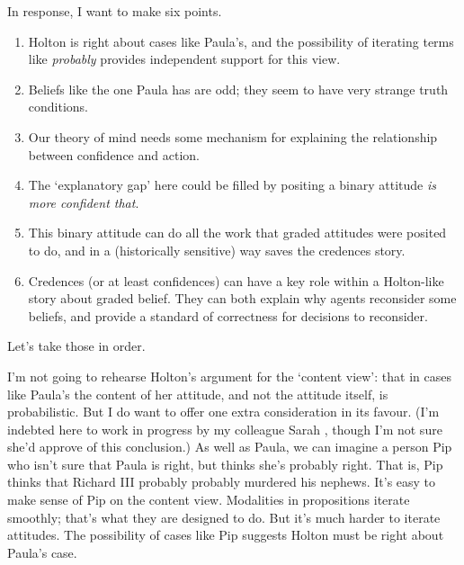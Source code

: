 In response, I want to make six points.

\begin{enumerate}
\item Holton is right about cases like Paula's, and the possibility of iterating terms like \textit{probably} provides independent support for this view.
\item Beliefs like the one Paula has are odd; they seem to have very strange truth conditions.
\item Our theory of mind needs some mechanism for explaining the relationship between confidence and action.
\item The `explanatory gap' here could be filled by positing a binary attitude \textit{is more confident that}.
\item This binary attitude can do all the work that graded attitudes were posited to do, and in a (historically sensitive) way saves the credences story.
\item Credences (or at least confidences) can have a key role within a Holton-like story about graded belief. They can both explain why agents reconsider some beliefs, and provide a standard of correctness for decisions to reconsider.
\end{enumerate}
Let's take those in order.

I'm not going to rehearse Holton's argument for the `content view': that in cases like Paula's the content of her attitude, and not the attitude itself, is probabilistic. But I do want to offer one extra consideration in its favour. (I'm indebted here to work in progress by my colleague Sarah \citet{MossPragmaticsEpistemicModals}, though I'm not sure she'd approve of this conclusion.) As well as Paula, we can imagine a person Pip who isn't sure that Paula is right, but thinks she's probably right. That is, Pip thinks that Richard III probably probably murdered his nephews. It's easy to make sense of Pip on the content view. Modalities in propositions iterate smoothly; that's what they are designed to do. But it's much harder to iterate attitudes. The possibility of cases like Pip suggests Holton must be right about Paula's case.

